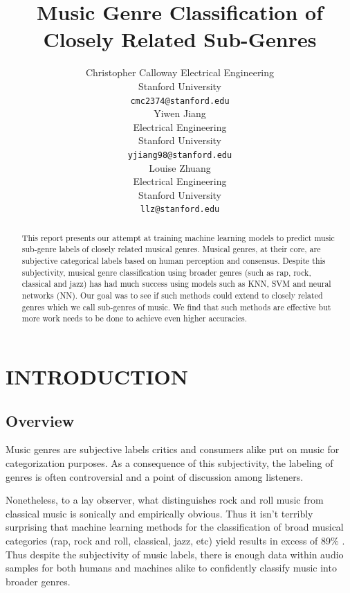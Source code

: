 \documentclass[letterpaper, 12 pt, conference]{ieeeconf}  %
\title{\LARGE \bf
Music Genre Classification of Closely Related Sub-Genres 
}
\author{ \parbox{2 in}{\centering Christopher Calloway
        Electrical Engineering\\
       Stanford University\\
        {\tt\small cmc2374@stanford.edu}}
        \hspace*{ 0.5 in}
        \parbox{2 in}{ \centering Yiwen Jiang\\
        Electrical Engineering \\
        Stanford University\\
        {\tt\small yjiang98@stanford.edu}}
          \hspace*{ 0.5 in}
        \parbox{2 in}{ \centering Louise Zhuang\\
        Electrical Engineering \\
        Stanford University\\
        {\tt\small llz@stanford.edu}}
}
\begin{document}
\maketitle
\thispagestyle{empty}
\pagestyle{empty}


\begin{abstract}

This report presents our attempt at training machine learning models to predict music sub-genre labels of closely related musical genres. Musical genres, at their core, are subjective categorical labels based on human perception and consensus. Despite this subjectivity, musical genre classification using broader genres (such as rap, rock, classical and jazz) has had much success using models such as KNN, SVM and neural networks (NN). Our goal was to see if such methods could extend to closely related genres  which we call sub-genres of music. We find that such methods are effective but more work needs to be done to achieve even higher accuracies. 




\end{abstract}


\section{INTRODUCTION}

\subsection{Overview}

Music genres are subjective labels critics and consumers alike put on music for categorization purposes. 
As a consequence of this subjectivity, the labeling of genres is often controversial and a point of discussion among listeners. 

Nonetheless, to a lay observer, what distinguishes rock and roll music from classical music is sonically and empirically obvious. Thus it isn't terribly surprising that machine learning methods for the classification of broad musical categories (rap, rock and roll, classical, jazz, etc) yield results in excess of 89\% \cite{c1, c2, c3}. Thus despite the subjectivity of music labels, there is enough data within audio samples for both humans and machines alike to confidently classify music into broader genres.
\end{document}
